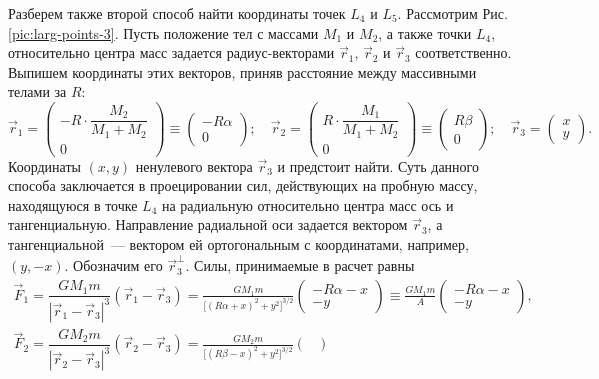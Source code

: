 \footnotesize{Разберем также второй способ найти координаты точек $L_{4}$ и $L_5$. Рассмотрим Рис.\,\ref{pic:larg-points-3}. Пусть положение тел с массами $M_1$ и $M_2$, а также точки $L_4$, относительно центра масс задается радиус-векторами $\vec{r}_1$, $\vec{r}_2$ и $\vec{r}_3$ соответственно. Выпишем координаты этих векторов, приняв расстояние между массивными телами за $R$:
\begin{equation*}
\vec{r}_1 = \begin{pmatrix}
-R \cdot \dfrac{M_2}{M_1 + M_2}\\[.5pc]
0
\end{pmatrix} \equiv \begin{pmatrix}
-R \alpha\\
0
\end{pmatrix}; \quad
\vec{r}_2 = \begin{pmatrix}
R \cdot \dfrac{M_1}{M_1 + M_2}\\[.5pc]
0
\end{pmatrix} \equiv \begin{pmatrix}
R \beta\\
0
\end{pmatrix}; \quad
\vec{r}_3 = \begin{pmatrix}
x\\
y
\end{pmatrix}.
\end{equation*}
Координаты $(x, y)$ ненулевого вектора $\vec{r}_3$  и предстоит найти. Суть данного способа заключается в проецировании сил, действующих на пробную массу, находящуюся в точке $L_4$ на радиальную относительно центра масс ось и тангенциальную. Направление радиальной оси задается вектором $\vec{r}_3$, а тангенциальной~---  вектором ей ортогональным с координатами, например, $(y, -x)$. Обозначим его $\vec{r}_3^\perp$. Силы, принимаемые в расчет равны
\begin{gather*}
\vec{F}_1 = \dfrac{G M_1 m}{|\vec{r}_1 - \vec{r}_3 |^3} (\vec{r}_1 - \vec{r}_3) = \frac{G M_1 m}{\big[ (R \alpha + x)^2 + y^2 \big]^{3/2}}\begin{pmatrix}
-R\alpha - x\\
-y
\end{pmatrix} \equiv \frac{G M_1 m}{A}\begin{pmatrix}
-R\alpha - x\\
-y
\end{pmatrix} ,\\
\vec{F}_2 = \dfrac{G M_2 m}{|\vec{r}_2 - \vec{r}_3 |^3} (\vec{r}_2 - \vec{r}_3) = \frac{G M_2 m}{\big[ (R \beta - x)^2 + y^2 \big]^{3/2}}\begin{pmatrix}

\end{pmatrix}
\end{gather*}}
